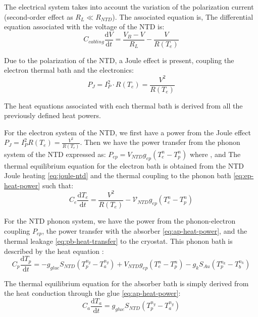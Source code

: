 The electrical system takes into account the variation of the polarization current (second-order effect as $R_L \ll R_{NTD}$). The associated equation is,
The differential equation associated with the voltage of the NTD is:
\begin{equation}
\label{eq:electric-eq}
C_{cabling} \frac{\mathrm{d} V}{\mathrm{d} t} = \frac{V_B - V}{R_L} - \frac{V}{R(T_e)}
\end{equation}

Due to the polarization of the NTD, a Joule effect is present, coupling the electron thermal bath and the electronics:
\begin{equation}
\label{eq:joule-ntd}
P_J= I_P^2 \cdot R(T_e)= \frac{V^2}{R(T_e)}
\end{equation}

The heat equations associated with each thermal bath is derived from all the previously defined heat powers. 

For the electron system of the NTD, we first have a power from the Joule effect $P_J= I_P^2 R(T_e)=\frac{V^2}{R(T_e)}$. Then we have the power transfer from the phonon system of the NTD expressed as: $P_{ep}=V_{NTD} g_{ep} (T_e^n - T_p^n)$ where ,  and  The thermal equilibrium equation for the electron bath is obtained from the NTD Joule heating \ref{eq:joule-ntd} and the thermal coupling to the phonon bath \ref{eq:ep-heat-power} such that:
\begin{equation}
\label{eq:heat-eq-electron}
 C_e \frac{\mathrm{d} T_e}{\mathrm{d} t} = \frac{V^2}{R(T_e)} - \mathcal{V}_{NTD} g_{ep} \left( T_e^{n} - T_p^{n} \right)
\end{equation}

For the NTD phonon system, we have the power from the phonon-electron coupling $P_{ep}$, the power transfer with the absorber \ref{eq:ap-heat-power}, and the thermal leakage \ref{eq:pb-heat-transfer} to the cryostat. This phonon bath is described by the heat equation :
\begin{equation}
\label{eq:heat-eq-phonon}
C_p \frac{\mathrm{d} T_p}{\mathrm{d} t}
=
-g_{glue} S_{NTD} \left( T_p^{n_g} - T_a^{n_g} \right) 
+ V_{NTD} g_{ep} \left( T_e^{n} - T_p^{n} \right)
- g_k S_{Au} \left( T_p^{n_k} - T_b^{n_k} \right)
\end{equation}

The thermal equilibrium equation for the absorber bath is simply derived from the heat conduction through the glue \ref{eq:ap-heat-power}:
\begin{equation}
\label{eq:heat-eq-absorber}
C_a \frac{\mathrm{d} T_a}{\mathrm{d} t} = g_{glue} S_{NTD} \left( T_p^{n_g} - T_a^{n_g} \right)
\end{equation}

